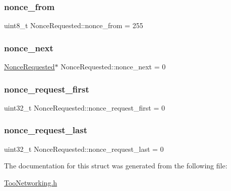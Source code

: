 \subsubsection{\texorpdfstring{nonce\+\_\+from}{nonce\_from}}
{\footnotesize\ttfamily uint8\+\_\+t Nonce\+Requested\+::nonce\+\_\+from = 255}

\mbox{\label{structNonceRequested_a5e3de3bf702eaea6ab86bc4677c9f4c8}} 
\subsubsection{\texorpdfstring{nonce\+\_\+next}{nonce\_next}}
{\footnotesize\ttfamily \hyperlink{structNonceRequested}{Nonce\+Requested}$\ast$ Nonce\+Requested\+::nonce\+\_\+next = 0}

\mbox{\label{structNonceRequested_a9e2f47eec20e01c7cce1acf2d47bbf14}} 
\subsubsection{\texorpdfstring{nonce\+\_\+request\+\_\+first}{nonce\_request\_first}}
{\footnotesize\ttfamily uint32\+\_\+t Nonce\+Requested\+::nonce\+\_\+request\+\_\+first = 0}

\mbox{\label{structNonceRequested_ae5453d115c1ba4044592921e0127f0c8}} 
\subsubsection{\texorpdfstring{nonce\+\_\+request\+\_\+last}{nonce\_request\_last}}
{\footnotesize\ttfamily uint32\+\_\+t Nonce\+Requested\+::nonce\+\_\+request\+\_\+last = 0}



The documentation for this struct was generated from the following file\+:\begin{DoxyCompactItemize}
\item 
\hyperlink{TooNetworking_8h}{Too\+Networking.\+h}\end{DoxyCompactItemize}
